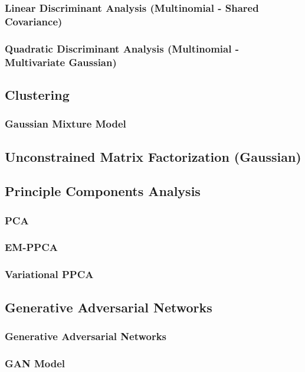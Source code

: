 \documentclass{article}
\begin{document}
\subsubsection{Linear Discriminant Analysis (Multinomial - Shared Covariance)}
\subsubsection{Quadratic Discriminant Analysis (Multinomial - Multivariate Gaussian)}

\subsection{Clustering}
\subsubsection{Gaussian Mixture Model}

\subsection{Unconstrained Matrix Factorization (Gaussian)}

\subsection{Principle Components Analysis}
\subsubsection{PCA}
\subsubsection{EM-PPCA}
\subsubsection{Variational PPCA}

\subsection{Generative Adversarial Networks}
\subsubsection{Generative Adversarial Networks}
\subsubsection{GAN Model}
\end{document}
